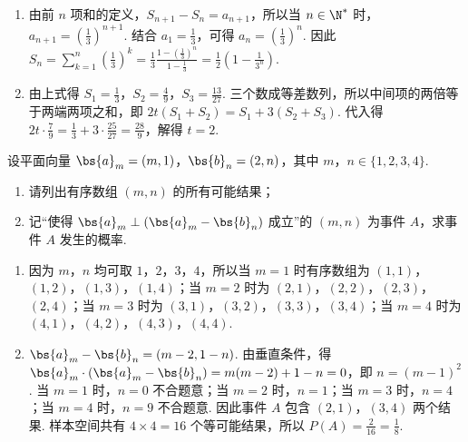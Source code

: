 \begin{solution}
\begin{enumerate}
\item 由前 \(n\) 项和的定义，\(S_{n+1}-S_n=a_{n+1}\)，所以当 \(n\in\N^*\) 时，\(a_{n+1}=\left(\frac{1}{3}\right)^{n+1}\). 结合 \(a_1=\frac{1}{3}\)，可得 \(a_n=\left(\frac{1}{3}\right)^n\). 因此 \(S_n=\displaystyle\sum_{k=1}^{n}\left(\frac{1}{3}\right)^k=\frac{1}{3}\frac{1-\left(\frac{1}{3}\right)^n}{1-\frac{1}{3}}=\frac{1}{2}\left(1-\frac{1}{3^n}\right)\).
\item 由上式得 \(S_1=\frac{1}{3}\)，\(S_2=\frac{4}{9}\)，\(S_3=\frac{13}{27}\). 三个数成等差数列，所以中间项的两倍等于两端两项之和，即 \(2t\left(S_1+S_2\right)=S_1+3\left(S_2+S_3\right)\). 代入得 \(2t\cdot\frac{7}{9}=\frac{1}{3}+3\cdot\frac{25}{27}=\frac{28}{9}\)，解得 \(t=2\).
\end{enumerate}
\end{solution}

\begin{problem}
设平面向量 \(\bs{a}_{m} = (m,1)\)，\(\bs{b}_{n} = (2,n)\)，其中 \(m\)，\(n \in \{1,2,3,4\}\).

\begin{enumerate}
\item 请列出有序数组 \(\left(m,n\right)\) 的所有可能结果；
\item 记“使得 \(\bs{a}_{m} \perp \left(\bs{a}_{m}-\bs{b}_{n}\right)\) 成立”的 \(\left(m,n\right)\) 为事件 \(A\)，求事件 \(A\) 发生的概率.
\end{enumerate}
\end{problem}

\begin{solution}
\begin{enumerate}
\item 因为 \(m\)，\(n\) 均可取 \(1\)，\(2\)，\(3\)，\(4\)，所以当 \(m=1\) 时有序数组为 \((1,1)\)，\((1,2)\)，\((1,3)\)，\((1,4)\)；当 \(m=2\) 时为 \((2,1)\)，\((2,2)\)，\((2,3)\)，\((2,4)\)；当 \(m=3\) 时为 \((3,1)\)，\((3,2)\)，\((3,3)\)，\((3,4)\)；当 \(m=4\) 时为 \((4,1)\)，\((4,2)\)，\((4,3)\)，\((4,4)\).
\item \(\bs{a}_m-\bs{b}_n=(m-2,1-n)\). 由垂直条件，得 \(\bs{a}_m\cdot\left(\bs{a}_m-\bs{b}_n\right)=m(m-2)+1-n=0\)，即 \(n=(m-1)^2\). 当 \(m=1\) 时，\(n=0\) 不合题意；当 \(m=2\) 时，\(n=1\)；当 \(m=3\) 时，\(n=4\)；当 \(m=4\) 时，\(n=9\) 不合题意. 因此事件 \(A\) 包含 \((2,1)\)，\((3,4)\) 两个结果. 样本空间共有 \(4\times4=16\) 个等可能结果，所以 \(P(A)=\frac{2}{16}=\frac{1}{8}\).
\end{enumerate}
\end{solution}

